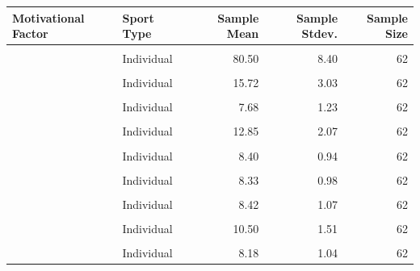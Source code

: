 \documentclass[
]{article}
\begin{document}
\begin{table}[H]
\centering\centering
\begin{tabular}{llrrr}
\toprule
Motivational Factor & Sport Type & Sample Mean & Sample Stdev. & Sample Size\\
\midrule
\cellcolor{gray!10}{Participation (total)} & \cellcolor{gray!10}{Team} & \cellcolor{gray!10}{75.67} & \cellcolor{gray!10}{9.38} & \cellcolor{gray!10}{203}\\
 & Individual & 80.50 & 8.40 & 62\\
\cellcolor{gray!10}{Achievement} & \cellcolor{gray!10}{Team} & \cellcolor{gray!10}{15.03} & \cellcolor{gray!10}{2.71} & \cellcolor{gray!10}{203}\\
 & Individual & 15.72 & 3.03 & 62\\
\cellcolor{gray!10}{Teamwork} & \cellcolor{gray!10}{Team} & \cellcolor{gray!10}{8.11} & \cellcolor{gray!10}{1.21} & \cellcolor{gray!10}{203}\\
\addlinespace
 & Individual & 7.68 & 1.23 & 62\\
\cellcolor{gray!10}{Energy Release} & \cellcolor{gray!10}{Team} & \cellcolor{gray!10}{11.88} & \cellcolor{gray!10}{2.05} & \cellcolor{gray!10}{203}\\
 & Individual & 12.85 & 2.07 & 62\\
\cellcolor{gray!10}{Fitness} & \cellcolor{gray!10}{Team} & \cellcolor{gray!10}{7.79} & \cellcolor{gray!10}{1.27} & \cellcolor{gray!10}{203}\\
 & Individual & 8.40 & 0.94 & 62\\
\addlinespace
\cellcolor{gray!10}{Situational Factors} & \cellcolor{gray!10}{Team} & \cellcolor{gray!10}{7.48} & \cellcolor{gray!10}{1.44} & \cellcolor{gray!10}{203}\\
 & Individual & 8.33 & 0.98 & 62\\
\cellcolor{gray!10}{Skill Development} & \cellcolor{gray!10}{Team} & \cellcolor{gray!10}{7.94} & \cellcolor{gray!10}{1.28} & \cellcolor{gray!10}{203}\\
 & Individual & 8.42 & 1.07 & 62\\
\cellcolor{gray!10}{Friendship} & \cellcolor{gray!10}{Team} & \cellcolor{gray!10}{9.57} & \cellcolor{gray!10}{1.78} & \cellcolor{gray!10}{203}\\
\addlinespace
 & Individual & 10.50 & 1.51 & 62\\
\cellcolor{gray!10}{Fun} & \cellcolor{gray!10}{Team} & \cellcolor{gray!10}{7.74} & \cellcolor{gray!10}{1.20} & \cellcolor{gray!10}{203}\\
 & Individual & 8.18 & 1.04 & 62\\
\bottomrule
\end{tabular}
\end{table}
\end{document}
